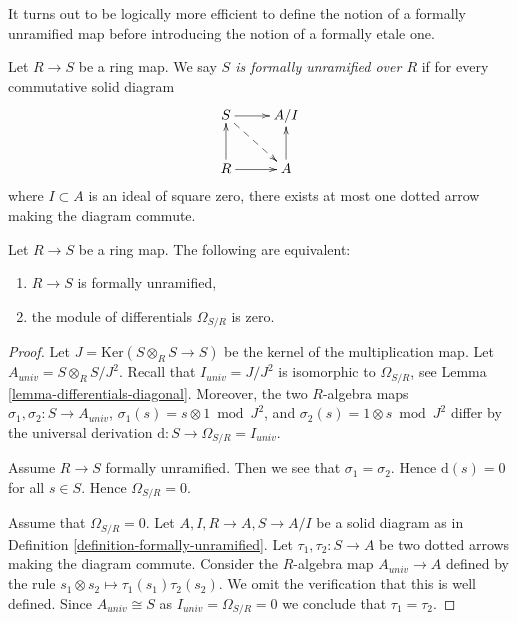 \noindent
It turns out to be logically more efficient to define
the notion of a formally unramified map before introducing
the notion of a formally etale one.

\begin{definition}
\label{definition-formally-unramified}
Let $R \to S$ be a ring map.
We say {\it $S$ is formally unramified over $R$} if for every
commutative solid diagram
$$
\xymatrix{
S \ar[r] \ar@{-->}[rd] & A/I \\
R \ar[r] \ar[u] & A \ar[u]
}
$$
where $I \subset A$ is an ideal of square zero, there exists
at most one dotted arrow making the diagram commute.
\end{definition}

\begin{lemma}
\label{lemma-characterize-formally-unramified}
Let $R \to S$ be a ring map.
The following are equivalent:
\begin{enumerate}
\item $R \to S$ is formally unramified,
\item the module of differentials $\Omega_{S/R}$ is zero.
\end{enumerate}
\end{lemma}

\begin{proof}
Let $J = \text{Ker}(S \otimes_R S \to S)$ be the kernel of
the multiplication map. Let $A_{univ} = S \otimes_R S/J^2$. Recall
that $I_{univ} = J/J^2$ is isomorphic to $\Omega_{S/R}$, see
Lemma \ref{lemma-differentials-diagonal}. Moreover, the two $R$-algebra maps
$\sigma_1, \sigma_2 : S \to A_{univ}$, $\sigma_1(s) = s \otimes 1 \bmod J^2$,
and $\sigma_2(s) = 1 \otimes s \bmod J^2$ differ by the
universal derivation $\text{d} : S \to \Omega_{S/R} = I_{univ}$.

\medskip\noindent
Assume $R \to S$ formally unramified.
Then we see that $\sigma_1 = \sigma_2$.
Hence $\text{d}(s) = 0$ for all $s \in S$.
Hence $\Omega_{S/R} = 0$.

\medskip\noindent
Assume that $\Omega_{S/R} = 0$. Let $A, I, R \to A, S \to A/I$
be a solid diagram as in Definition \ref{definition-formally-unramified}.
Let $\tau_1, \tau_2 : S \to A$ be two dotted arrows making the
diagram commute. Consider the $R$-algebra map $A_{univ} \to A$
defined by the rule $s_1 \otimes s_2 \mapsto \tau_1(s_1)\tau_2(s_2)$.
We omit the verification that this is well defined. Since $A_{univ} \cong S$
as $I_{univ} = \Omega_{S/R} = 0$ we conclude that $\tau_1 = \tau_2$.
\end{proof}

















